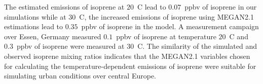 The estimated emissions of isoprene at $20$~\degree C lead to $0.07$~ppbv of isoprene in our simulations while at $30$~\degree C, the increased emissions of isoprene using MEGAN2.1 estimations lead to $0.35$~ppbv of isoprene in the model.
A measurement campaign over Essen, Germany \citep{Wagner:2014} measured $0.1$~ppbv of isoprene at temperature $20$~\degree C and $0.3$~ppbv of isoprene were measured at $30$~\degree C.
The similarity of the simulated and observed isoprene mixing ratios indicates that the MEGAN2.1 variables chosen for calculating the temperature-dependent emissions of isoprene were suitable for simulating urban conditions over central Europe.
